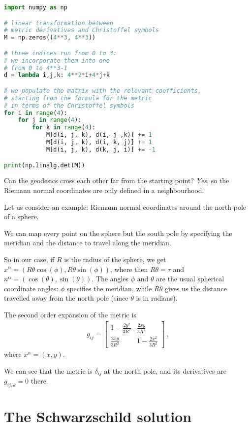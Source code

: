 \documentclass[main.tex]{subfiles}
\begin{document}
\begin{lstlisting}[language=Python]
import numpy as np

# linear transformation between
# metric derivatives and Christoffel symbols
M = np.zeros((4**3, 4**3))

# three indices run from 0 to 3:
# we incorporate them into one
# from 0 to 4**3-1
d = lambda i,j,k: 4**2*i+4*j+k

# we populate the matrix with the relevant coefficients,
# starting from the formula for the metric
# in terms of the Christoffel symbols
for i in range(4):
    for j in range(4):
        for k in range(4):
            M[d(i, j, k), d(i, j ,k)] += 1
            M[d(i, j, k), d(i, k, j)] += 1
            M[d(i, j, k), d(k, j, i)] += -1

print(np.linalg.det(M))
\end{lstlisting}

Can the geodesics cross each other far from the starting point? \emph{Yes}, so the Riemann normal coordinates are only defined in a neighbourhood.

Let us consider an example: Riemann normal coordinates around the north pole of a sphere.

We can map every point on the sphere but the south pole by specifying the meridian and the distance to travel along the meridian.

So in our case, if \(R\) is the radius of the sphere, we get \(x^{\alpha } = (R \theta \cos(\phi ), R \theta \sin(\phi ))\), where then \(R \theta = \tau \) and \(n^{\alpha } = (\cos(\theta ), \sin(\theta ))\).
The angles \(\phi \) and \(\theta \) are the usual spherical coordinate angles: \(\phi \) specifies the meridian, while \(R\theta \) gives us the distance travelled away from the north pole (since \(\theta \) is in radians).

The second order expansion of the metric is 
%
\begin{align}
  g_{ij} = \left[\begin{array}{cc}
  1 - \frac{2y^2}{3R^2} & \frac{2xy}{3R^2} \\ 
  \frac{2xy}{3R^2} & 1-\frac{2x^2}{3R^2}
  \end{array}\right]
\,,
\end{align}
%
where \(x^{\alpha } = (x, y)\).

We can see that the metric is \(\delta_{ij}\) at the north pole, and its derivatives are \(g_{ij,k}= 0\) there.

\section{The Schwarzschild solution}
\end{document}
